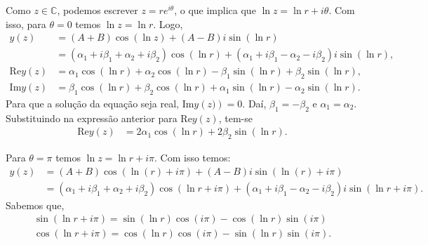 \documentclass[a4paper,12pt, leqno, answers]{exam}
\begin{document}
\begin{questions}
\begin{solution}
        Como $z \in \mathbb{C}$, podemos escrever $z = r e^{i \theta}$, o que implica que $\ln z = \ln r + i \theta$. Com isso, para $\theta = 0$ temos $\ln z = \ln r$. Logo,
        \begin{align*}
            y(z) &= \left( A + B \right) \cos\left( \ln z \right) + \left( A - B \right) i \sin \left( \ln r \right) \\
            &= \left( \alpha_1 + i \beta_1 + \alpha_2 + i\beta_2 \right) \cos \left( \ln r \right) + \left( \alpha_1 + i \beta_1 - \alpha_2 - i\beta_2 \right) i \sin\left( \ln r \right), \\
            \mathrm{Re} y\left( z \right) &= \alpha_1 \cos\left( \ln r \right) + \alpha_2 \cos\left( \ln r \right) - \beta_1 \sin\left( \ln r \right) + \beta_2 \sin\left( \ln r \right), \\
            \mathrm{Im} y\left( z \right) &= \beta_1 \cos\left( \ln r \right) + \beta_2 \cos\left( \ln r \right) + \alpha_1 \sin\left( \ln r \right) - \alpha_2 \sin\left( \ln r \right).
        \end{align*}
        Para que a solu\c{c}\~{a}o da equa\c{c}\~{a}o seja real, $\mathrm{Im} y\left( z) \right) = 0$. Da\'{i}, $\beta_1 = -\beta_2$ e $\alpha_1 = \alpha_2$. Substituindo na express\~{a}o anterior para $\mathrm{Re} y\left( z \right)$, tem-se
        \begin{align*}
            \mathrm{Re} y\left( z \right) &= 2\alpha_1 \cos\left( \ln r \right) + 2 \beta_2 \sin\left( \ln r \right).
        \end{align*}

        Para $\theta = \pi$ temos $\ln z = \ln r + i \pi$. Com isso temos:
        \begin{align*}
            y\left( z \right) &= \left( A + B \right) \cos\left( \ln\left( r \right) + i \pi\right) + \left( A - B \right) i \sin\left( \ln\left( r \right) +i \pi\right) \\
            & = \left( \alpha_1 + i \beta_1 + \alpha_2 + i\beta_2 \right) \cos \left( \ln r + i \pi \right) + \left( \alpha_1 + i \beta_1 - \alpha_2 - i\beta_2 \right) i \sin\left( \ln r + i \pi \right).
        \end{align*}
        Sabemos que,
        \begin{align*}
            \sin\left(\ln r + i \pi\right) = \sin\left(\ln r\right) \cos\left(i \pi\right) - \cos\left(\ln r\right) \sin\left(i \pi\right)\\
            \cos\left(\ln r + i \pi\right) = \cos\left(\ln r\right) \cos\left(i \pi\right) - \sin\left(\ln r\right) \sin\left(i \pi\right).
        \end{align*}


\end{solution}
\end{questions}
\end{document}
